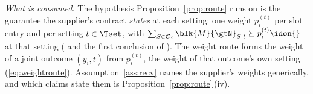 
\begin{remark}
\label{rem:minweight}
\emph{What is consumed.} The hypothesis Proposition~\ref{prop:route} runs on
is the guarantee the supplier's contract \emph{states} at each setting: one
weight $p^{(t)}_i$ per slot entry and per setting $t\in\Tset$, with
$\sum_{S\in\mathcal{O}_i}\blk{M}{\gtN}_{S|t}\succeq p^{(t)}_i\idon{}$ at that
setting ( and the first conclusion of
). The weight route forms the weight of a
joint outcome $(y_i,t)$ from $p^{(t)}_i$, the weight of that outcome's own
setting (\eqref{eq:weightroute}). Assumption~\ref{ass:recv} names the
supplier's weights generically, and which claims state them is
Proposition~\ref{prop:route}\,(iv).


\end{remark}
